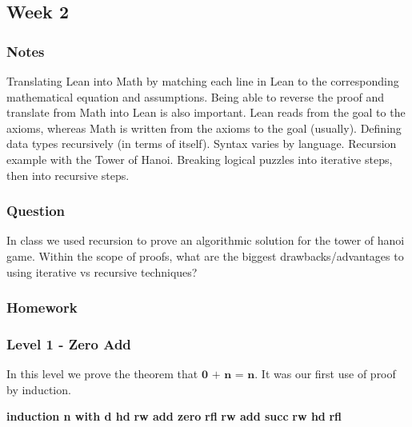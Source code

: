 \documentclass{article}
\theoremstyle{theorem}
\theoremstyle{definition}
\theoremstyle{remark}
\begin{document}
\subsection{Week 2}

\subsubsection*{Notes}
Translating Lean into Math by matching each line in Lean to the corresponding mathematical equation and assumptions. Being able to reverse the proof and translate from Math into Lean is also important. Lean reads from the goal to the axioms, whereas Math is written from the axioms to the goal (usually).
\newline \newline Defining data types recursively (in terms of itself). Syntax varies by language. 
\newline \newline Recursion example with the Tower of Hanoi. Breaking logical puzzles into iterative steps, then into recursive steps.

\subsubsection*{Question}
In class we used recursion to prove an algorithmic solution for the tower of hanoi game. Within the scope of proofs, what are the biggest drawbacks/advantages to using iterative vs recursive techniques?


\subsubsection*{Homework}

\subsubsection*{Level 1 - Zero Add}
  In this level we prove the theorem that $\textbf{0 + n = n}$. It was our first use of proof by induction.

  \bgroup\obeylines
  \qquad \textbf{induction n with d hd}
  \qquad \textbf{rw add zero}
  \qquad \textbf{rfl}
  \qquad \textbf{rw add succ}
  \qquad \textbf{rw hd}
  \qquad \textbf{rfl}
  \egroup
\end{document}

